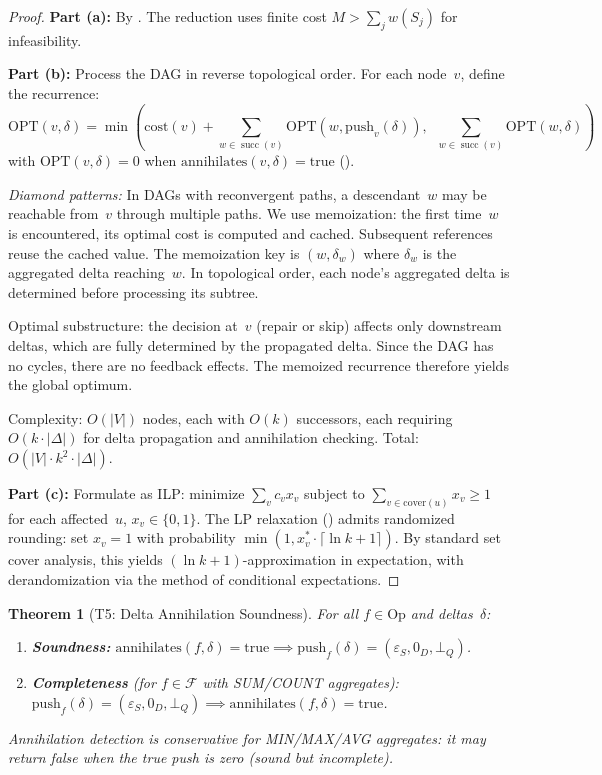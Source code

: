 \documentclass[11pt,a4paper]{article}
\newtheorem{theorem}{Theorem}[section]
\theoremstyle{definition}
\newcommand{\epsS}{\varepsilon_S}
\newcommand{\zeroD}{0_D}
\newcommand{\botQ}{\bot_Q}
\newcommand{\push}{\mathrm{push}}
\newcommand{\ann}{\mathrm{annihilates}}
\newcommand{\cost}{\mathrm{cost}}
\newcommand{\OPT}{\mathrm{OPT}}
\newcommand{\Op}{\mathrm{Op}}
\newcommand{\FragF}{\mathcal{F}}
\DeclareMathOperator{\succ}{succ}
\begin{document}
\begin{proof}
\textbf{Part (a):} By .  The reduction uses finite cost
$M > \sum_j w(S_j)$ for infeasibility.

\textbf{Part (b):} Process the DAG in reverse topological order.  For each
node~$v$, define the recurrence:
\[
\OPT(v, \delta) = \min\!\left(
  \cost(v) + \sum_{w \in \succ(v)} \OPT(w, \push_v(\delta)),\;\;
  \sum_{w \in \succ(v)} \OPT(w, \delta)\right)
\]
with $\OPT(v, \delta) = 0$ when $\ann(v, \delta) = \mathrm{true}$
().

\emph{Diamond patterns:} In DAGs with reconvergent paths, a descendant~$w$ may
be reachable from~$v$ through multiple paths.  We use memoization: the first
time~$w$ is encountered, its optimal cost is computed and cached.  Subsequent
references reuse the cached value.  The memoization key is $(w, \delta_w)$ where
$\delta_w$ is the aggregated delta reaching~$w$.  In topological order, each
node's aggregated delta is determined before processing its subtree.

Optimal substructure: the decision at~$v$ (repair or skip) affects only
downstream deltas, which are fully determined by the propagated delta.  Since
the DAG has no cycles, there are no feedback effects.  The memoized recurrence
therefore yields the global optimum.

Complexity: $O(|V|)$ nodes, each with $O(k)$ successors, each requiring
$O(k \cdot |\Delta|)$ for delta propagation and annihilation checking.
Total: $O(|V| \cdot k^2 \cdot |\Delta|)$.

\textbf{Part (c):} Formulate as ILP: minimize $\sum_v c_v x_v$ subject to
$\sum_{v \in \mathrm{cover}(u)} x_v \geq 1$ for each affected~$u$,
$x_v \in \{0,1\}$.  The LP relaxation () admits
randomized rounding: set $x_v = 1$ with probability
$\min(1, x_v^* \cdot \lceil\ln k + 1\rceil)$.  By standard set cover
analysis, this yields $(\ln k + 1)$-approximation in expectation, with
derandomization via the method of conditional expectations.
\end{proof}

\begin{theorem}[T5: Delta Annihilation Soundness]\label{thm:annihilation-sound}
For all $f \in \Op$ and deltas~$\delta$:
\begin{enumerate}[label=(\alph*)]
  \item \textbf{Soundness:}
    $\ann(f, \delta) = \mathrm{true} \implies \push_f(\delta) = (\epsS, \zeroD, \botQ)$.
  \item \textbf{Completeness} (for $f \in \FragF$ with SUM/COUNT aggregates):
    $\push_f(\delta) = (\epsS, \zeroD, \botQ) \implies \ann(f, \delta) = \mathrm{true}$.
\end{enumerate}
Annihilation detection is conservative for MIN/MAX/AVG aggregates: it may
return false when the true push is zero (sound but incomplete).
\end{theorem}
\end{document}
